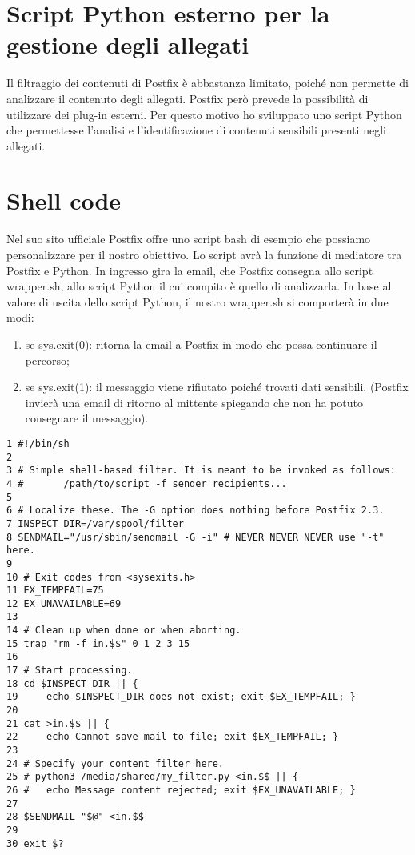    \section{Script Python esterno per la gestione degli allegati}
    Il filtraggio dei contenuti di Postfix è abbastanza limitato, poiché non permette di analizzare il contenuto
    degli allegati. Postfix però prevede la possibilità di utilizzare dei plug-in esterni. Per questo motivo ho 
    sviluppato uno script Python che permettesse l'analisi e l'identificazione di contenuti sensibili presenti 
    negli allegati.


    \section{Shell code}
    Nel suo sito ufficiale Postfix offre uno script bash di esempio che possiamo personalizzare per il nostro 
    obiettivo. Lo script avrà la funzione di mediatore tra Postfix e Python. 
    In ingresso gira la email, che Postfix consegna allo script wrapper.sh, allo script Python 
    il cui compito è quello di analizzarla.
    In base al valore di uscita dello script Python, il nostro wrapper.sh si comporterà in due modi:

    
    \begin{enumerate}
        \item se sys.exit(0): ritorna la email a Postfix in modo che possa continuare il percorso;
        \item se sys.exit(1): il messaggio viene rifiutato poiché trovati dati sensibili. (Postfix invierà una 
        email di ritorno al mittente spiegando che non ha potuto consegnare il messaggio). 
    \end{enumerate}

    \begin{verbatim}
1 #!/bin/sh
2 
3 # Simple shell-based filter. It is meant to be invoked as follows:
4 #       /path/to/script -f sender recipients...
5 
6 # Localize these. The -G option does nothing before Postfix 2.3.
7 INSPECT_DIR=/var/spool/filter
8 SENDMAIL="/usr/sbin/sendmail -G -i" # NEVER NEVER NEVER use "-t" here.
9 
10 # Exit codes from <sysexits.h>
11 EX_TEMPFAIL=75
12 EX_UNAVAILABLE=69
13 
14 # Clean up when done or when aborting.
15 trap "rm -f in.$$" 0 1 2 3 15
16 
17 # Start processing.
18 cd $INSPECT_DIR || {
19     echo $INSPECT_DIR does not exist; exit $EX_TEMPFAIL; }
20 
21 cat >in.$$ || { 
22     echo Cannot save mail to file; exit $EX_TEMPFAIL; }
23 
24 # Specify your content filter here.
25 # python3 /media/shared/my_filter.py <in.$$ || {
26 #   echo Message content rejected; exit $EX_UNAVAILABLE; }
27 
28 $SENDMAIL "$@" <in.$$
29 
30 exit $?
    \end{verbatim}

